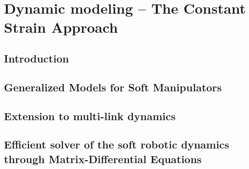 \chapter[Dynamic modeling of Soft Robots -- PCC case]{Dynamic modeling -- The  Constant Strain Approach}
\label{chap: chapter 1}




\section{Introduction} \label{sec: chap1 1_introduction}


\newpage
\section{Generalized Models for Soft Manipulators}  \label{sec: chap2 section header}


\newpage
\section{Extension to multi-link dynamics}  \label{sec: chap2 section header}


\section{Efficient solver of the soft robotic dynamics through Matrix-Differential Equations}  \label{sec: chap2 section header}


